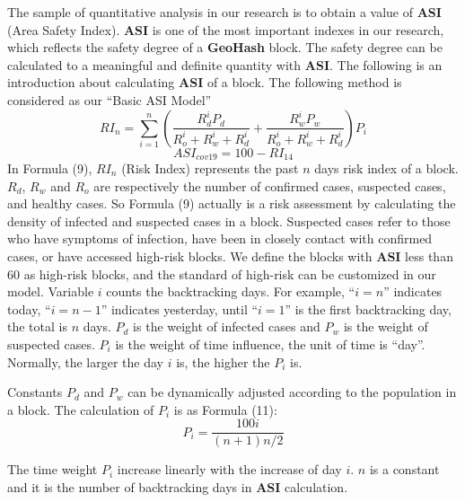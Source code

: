 \documentclass[conference]{IEEEtran}
\begin{document}
The sample of quantitative analysis in our research is to obtain a value of \textbf{ASI} (Area Safety Index).
\textbf{ASI} is one of the most important indexes in our research, which reflects the safety degree of a \textbf{GeoHash} block.
The safety degree can be calculated to a meaningful and definite quantity with \textbf{ASI}.
The following is an introduction about calculating \textbf{ASI} of a block.
The following method is considered as our ``Basic ASI Model''
\begin{equation}
    RI_n=\sum_{i=1}^n\left(\frac{R_d^iP_d}{R_o^i+R_w^i+R_d^i}+\frac{R_w^iP_w}{R_o^i+R_w^i+R_d^i}\right)P_i
\end{equation}
\begin{equation}
    ASI_{cov19}=100-RI_{14}
\end{equation}
In Formula (9), $RI_n$ (Risk Index) represents the past $n$ days risk index of a block.
$R_d$, $R_w$ and $R_o$ are respectively the number of confirmed cases, suspected cases, and healthy cases.
So Formula (9) actually is a risk assessment by calculating the density of infected and suspected cases in a block.
Suspected cases refer to those who have symptoms of infection, have been in closely contact with confirmed cases, or have accessed high-risk blocks.
We define the blocks with \textbf{ASI} less than 60 as high-risk blocks, and the standard of high-risk can be customized in our model.
Variable $i$ counts the backtracking days.
For example, ``$i=n$'' indicates today, ``$i=n-1$'' indicates yesterday, until ``$i=1$'' is the first backtracking day, the total is $n$ days.
$P_d$ is the weight of infected cases and $P_w$ is the weight of suspected cases.
$P_i$ is the weight of time influence, the unit of time is ``day''.
Normally, the larger the day $i$ is, the higher the $P_i$ is.

Constants $P_d$ and $P_w$ can be dynamically adjusted according to the population in a block.
The calculation of $P_i$ is as Formula (11):
\begin{equation}
    P_i=\frac{100i}{(n+1)n/2}
\end{equation}

The time weight $P_i$ increase linearly with the increase of day $i$.
$n$ is a constant and it is the number of backtracking days in \textbf{ASI} calculation.
\end{document}
